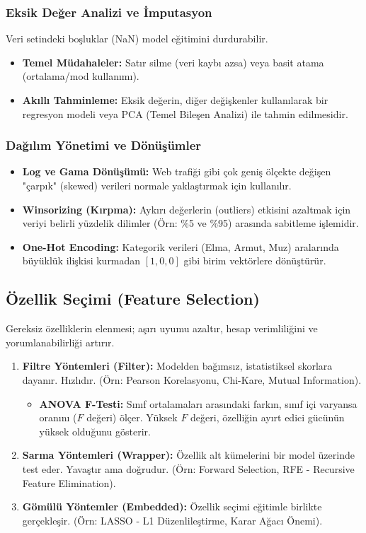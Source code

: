 \documentclass[12pt,a4paper]{article}
\begin{document}
\subsubsection{Eksik Değer Analizi ve İmputasyon}
Veri setindeki boşluklar (NaN) model eğitimini durdurabilir.
\begin{itemize}
    \item \textbf{Temel Müdahaleler:} Satır silme (veri kaybı azsa) veya basit atama (ortalama/mod kullanımı).
    \item \textbf{Akıllı Tahminleme:} Eksik değerin, diğer değişkenler kullanılarak bir regresyon modeli veya PCA (Temel Bileşen Analizi) ile tahmin edilmesidir.
\end{itemize}

\subsubsection{Dağılım Yönetimi ve Dönüşümler}
\begin{itemize}
    \item \textbf{Log ve Gama Dönüşümü:} Web trafiği gibi çok geniş ölçekte değişen "çarpık" (skewed) verileri normale yaklaştırmak için kullanılır.
    \item \textbf{Winsorizing (Kırpma):} Aykırı değerlerin (outliers) etkisini azaltmak için veriyi belirli yüzdelik dilimler (Örn: \%5 ve \%95) arasında sabitleme işlemidir.
    \item \textbf{One-Hot Encoding:} Kategorik verileri (Elma, Armut, Muz) aralarında büyüklük ilişkisi kurmadan $[1, 0, 0]$ gibi birim vektörlere dönüştürür.
\end{itemize}

\subsection{Özellik Seçimi (Feature Selection)}
Gereksiz özelliklerin elenmesi; aşırı uyumu azaltır, hesap verimliliğini ve yorumlanabilirliği artırır.

\begin{enumerate}
    \item \textbf{Filtre Yöntemleri (Filter):} Modelden bağımsız, istatistiksel skorlara dayanır. Hızlıdır. (Örn: Pearson Korelasyonu, Chi-Kare, Mutual Information).
    \begin{itemize}
        \item \textbf{ANOVA F-Testi:} Sınıf ortalamaları arasındaki farkın, sınıf içi varyansa oranını ($F$ değeri) ölçer. Yüksek $F$ değeri, özelliğin ayırt edici gücünün yüksek olduğunu gösterir.
    \end{itemize}
    \item \textbf{Sarma Yöntemleri (Wrapper):} Özellik alt kümelerini bir model üzerinde test eder. Yavaştır ama doğrudur. (Örn: Forward Selection, RFE - Recursive Feature Elimination).
    \item \textbf{Gömülü Yöntemler (Embedded):} Özellik seçimi eğitimle birlikte gerçekleşir. (Örn: LASSO - L1 Düzenlileştirme, Karar Ağacı Önemi).
\end{enumerate}
\end{document}
